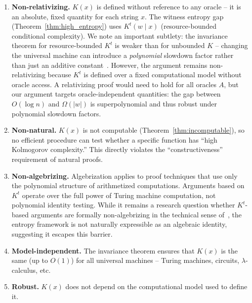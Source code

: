 \documentclass[aps,prd,twocolumn,superscriptaddress,nofootinbib]{revtex4-2}
\theoremstyle{definition}
\theoremstyle{remark}
\begin{document}
\begin{enumerate}
\item[\textbf{(S1)}] \textbf{Non-relativizing.} $K(x)$ is defined without reference to any oracle -- it is an absolute, fixed quantity for each string $x$. The witness entropy gap (Theorem~\ref{thm:high_entropy}) uses $K^t(w \mid x)$ (resource-bounded conditional complexity). We note an important subtlety: the invariance theorem for resource-bounded $K^t$ is weaker than for unbounded $K$ -- changing the universal machine can introduce a \textit{polynomial} slowdown factor rather than just an additive constant~\cite{LiVitanyi2008}. However, the argument remains non-relativizing because $K^t$ is defined over a fixed computational model without oracle access. A relativizing proof would need to hold for all oracles $A$, but our argument targets oracle-independent quantities: the gap between $O(\log n)$ and $\Omega(|w|)$ is superpolynomial and thus robust under polynomial slowdown factors.

\item[\textbf{(S2)}] \textbf{Non-natural.} $K(x)$ is not computable (Theorem~\ref{thm:incomputable}), so no efficient procedure can test whether a specific function has ``high Kolmogorov complexity.'' This directly violates the ``constructiveness'' requirement of natural proofs.

\item[\textbf{(S3)}] \textbf{Non-algebrizing.} Algebrization applies to proof techniques that use only the polynomial structure of arithmetized computations. Arguments based on $K^t$ operate over the full power of Turing machine computation, not polynomial identity testing. While it remains a research question whether $K^t$-based arguments are formally non-algebrizing in the technical sense of~\cite{AaronsonWigderson2009}, the entropy framework is not naturally expressible as an algebraic identity, suggesting it escapes this barrier.

\item[\textbf{(S4)}] \textbf{Model-independent.} The invariance theorem ensures that $K(x)$ is the same (up to $O(1)$) for all universal machines -- Turing machines, circuits, $\lambda$-calculus, etc.

\item[\textbf{(S5)}] \textbf{Robust.} $K(x)$ does not depend on the computational model used to define it.
\end{enumerate}
\end{document}
